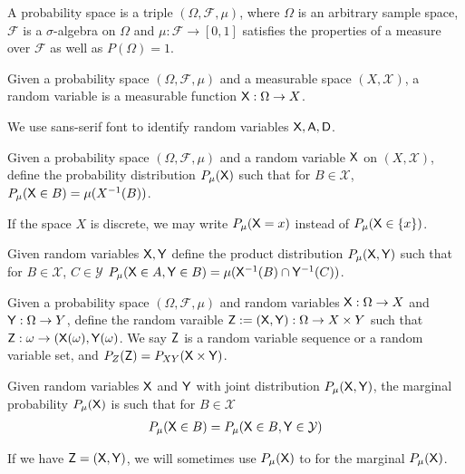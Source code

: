 \begin{definition}
A probability space is a triple $(\Omega,\mathcal{F},\mu)$, where $\Omega$ is an arbitrary sample space, $\mathcal{F}$ is a $\sigma$-algebra on $\Omega$ and $\mu:\mathcal{F}\to[0,1]$ satisfies the properties of a measure over $\mathcal{F}$ as well as $P(\Omega)=1$.
\end{definition}

\begin{definition}\label{def:random_variable}
Given a probability space $(\Omega,\mathcal{F},\mu)$ and a measurable space $(X,\mathcal{X})$, a random variable is a measurable function $\mathsf{X}:\Omega\to X$.

We use sans-serif font to identify random variables $\mathsf{X,A,D}$.
\end{definition}

\begin{definition}
Given a probability space $(\Omega,\mathcal{F},\mu)$ and a random variable $\mathsf{X}$ on $(X,\mathcal{X})$, define the probability distribution $P_\mu(\mathsf{X})$ such that for $B\in \mathcal{X}$, $P_\mu(\mathsf{X}\in B)=\mu(X^{-1}(B))$.

If the space $X$ is discrete, we may write $P_\mu(\mathsf{X}=x)$ instead of $P_\mu(\mathsf{X}\in\{x\})$.

Given random variables $\mathsf{X},\mathsf{Y}$ define the product distribution $P_\mu(\mathsf{X},\mathsf{Y})$ such that for $B\in\mathcal{X}$, $C\in\mathcal{Y}$ $P_\mu(\mathsf{X}\in A,\mathsf{Y}\in B)=\mu(\mathsf{X}^{-1}(B)\cap \mathsf{Y}^{-1}(C))$.
\end{definition}

\begin{definition}
Given a probability space $(\Omega,\mathcal{F},\mu)$ and random variables $\mathsf{X}:\Omega\to X$ and $\mathsf{Y}:\Omega\to Y$, define the random varaible $\mathsf{Z}:=(\mathsf{X},\mathsf{Y}):\Omega\to X\times Y$  such that $\mathsf{Z}:\omega\to (\mathsf{X}(\omega),\mathsf{Y}(\omega)$. We say $\mathsf{Z}$ is a random variable sequence or a random variable set, and $P_Z(\mathsf{Z})=P_{XY}(\mathsf{X}\times\mathsf{Y})$.
\end{definition}

\begin{definition}
Given random variables $\mathsf{X}$ and $\mathsf{Y}$ with joint distribution $P_\mu(\mathsf{X},\mathsf{Y})$, the marginal probability $P_\mu(\mathsf{X})$ is such that for $B\in\mathcal{X}$
\begin{align*}
    P_\mu(\mathsf{X}\in B) = P_\mu(\mathsf{X}\in B,\mathsf{Y}\in \mathcal{Y})
\end{align*}

If we have $\mathsf{Z}=(\mathsf{X},\mathsf{Y})$, we will sometimes use $P_\mu(\mathsf{X})$ to for the marginal $P_\mu(\mathsf{X})$.
\end{definition}

